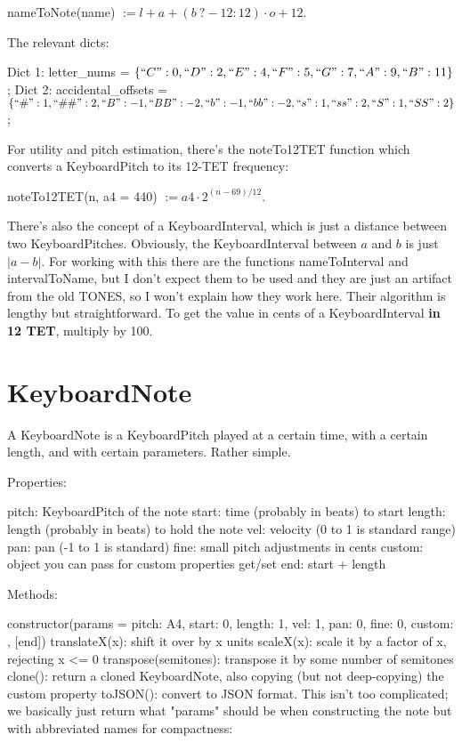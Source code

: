 \documentclass{article}
\begin{document}
nameToNote(name) $:=l + a + (b\: ? -12 : 12)\cdot o + 12.$

The relevant dicts:

Dict 1: letter\_nums = $\{ ``C": 0, ``D": 2, ``E": 4, ``F": 5, ``G": 7, ``A": 9, ``B": 11 \}$;
Dict 2: accidental\_offsets = $\{ ``\#": 1, ``\#\#": 2, ``B": -1, ``BB": -2, ``b": -1, ``bb": -2, ``s": 1, ``ss": 2, ``S": 1, ``SS": 2 \}$;

For utility and pitch estimation, there's the noteTo12TET function which converts a KeyboardPitch to its 12-TET frequency:

noteTo12TET(n, a4 = 440) $:= a4 \cdot 2^{(n - 69)/12}.$

There's also the concept of a KeyboardInterval, which is just a distance between two KeyboardPitches. Obviously, the KeyboardInterval between $a$ and $b$ is just $|a-b|$. For working with this there are the functions nameToInterval and intervalToName, but I don't expect them to be used and they are just an artifact from the old TONES, so I won't explain how they work here. Their algorithm is lengthy but straightforward. To get the value in cents of a KeyboardInterval \textbf{in 12 TET}, multiply by 100.

\section{KeyboardNote}

A KeyboardNote is a KeyboardPitch played at a certain time, with a certain length, and with certain parameters. Rather simple.

Properties:

pitch: KeyboardPitch of the note
start: time (probably in beats) to start
length: length (probably in beats) to hold the note
vel: velocity (0 to 1 is standard range)
pan: pan (-1 to 1 is standard)
fine: small pitch adjustments in cents
custom: object you can pass for custom properties
get/set end: start + length

Methods:

constructor(params = {pitch: A4, start: 0, length: 1, vel: 1, pan: 0, fine: 0, custom: {}, [end]})
translateX(x): shift it over by x units
scaleX(x): scale it by a factor of x, rejecting x <= 0
transpose(semitones): transpose it by some number of semitones
clone(): return a cloned KeyboardNote, also copying (but not deep-copying) the custom property
toJSON(): convert to JSON format. This isn't too complicated; we basically just return what "params" should be when constructing the note but with abbreviated names for compactness:
\end{document}
